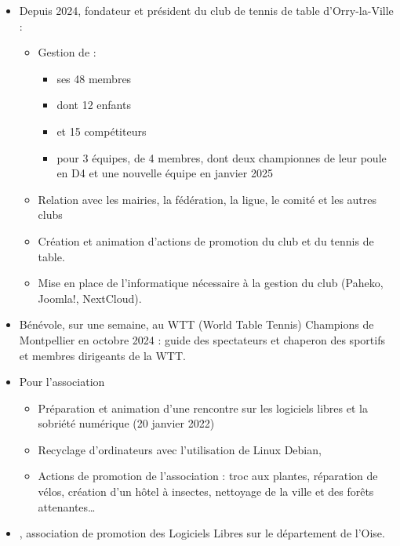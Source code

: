 \begin{itemize}
    \item{Depuis 2024, fondateur et président du club de tennis de table d’Orry-la-Ville  :}
        \begin{itemize}
            \item{Gestion de :}
                \begin{itemize}
                    \item{ses 48 membres}
                    \item{dont 12 enfants}
                    \item{et 15 compétiteurs}
                    \item{pour 3 équipes, de 4 membres, dont deux championnes de leur poule en D4 et une nouvelle équipe en janvier 2025}
                \end{itemize}
            \item{Relation avec les mairies, la fédération, la ligue, le comité et les autres clubs}
            \item{Création et animation d’actions de promotion du club et du tennis de table.}
            \item{Mise en place de l’informatique nécessaire à la gestion du club (Paheko, Joomla!, NextCloud).}
        \end{itemize}
    \item{Bénévole, sur une semaine, au WTT (World Table Tennis) Champions de Montpellier en octobre 2024 : guide des spectateurs et chaperon des sportifs et membres dirigeants de la WTT.}
    \item{Pour l'association }
        \begin{itemize}
            \item{Préparation et animation d'une rencontre sur les logiciels libres et la sobriété numérique (20 janvier 2022)}
            \item{Recyclage d'ordinateurs avec l'utilisation de Linux Debian,}
            \item{Actions de promotion de l'association : troc aux plantes, réparation de vélos, création d'un hôtel à insectes, nettoyage de la ville et des forêts attenantes\ldots}
        \end{itemize}
    \item{, association de promotion des Logiciels Libres sur le département de l'Oise.}

\end{itemize}
